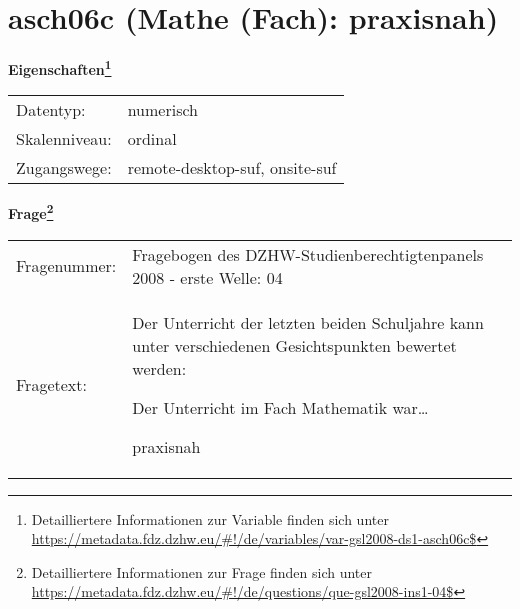 
    \setcounter{footnote}{0}

    \vspace*{-1.8cm}
	\section{asch06c (Mathe (Fach): praxisnah)}
	\label{section:asch06c}



    \vspace*{0.5cm}
    \noindent\textbf{Eigenschaften\footnote{Detailliertere Informationen zur Variable finden sich unter
		\url{https://metadata.fdz.dzhw.eu/\#!/de/variables/var-gsl2008-ds1-asch06c$}}}\\
	\begin{tabularx}{\hsize}{@{}lX}
	Datentyp: & numerisch \\
	Skalenniveau: & ordinal \\
	Zugangswege: &
	  remote-desktop-suf, 
	  onsite-suf
 \\
    \end{tabularx}



				\vspace*{0.5cm}
                \noindent\textbf{Frage\footnote{Detailliertere Informationen zur Frage finden sich unter
		              \url{https://metadata.fdz.dzhw.eu/\#!/de/questions/que-gsl2008-ins1-04$}}}\\
				\begin{tabularx}{\hsize}{@{}lX}
					Fragenummer: &
					  Fragebogen des DZHW-Studienberechtigtenpanels 2008 - erste Welle:
					  04
 \\
					Fragetext: & Der Unterricht der letzten beiden Schuljahre kann unter verschiedenen Gesichtspunkten bewertet werden:\par  Der Unterricht im Fach Mathematik war…\par  praxisnah \\
				\end{tabularx}





